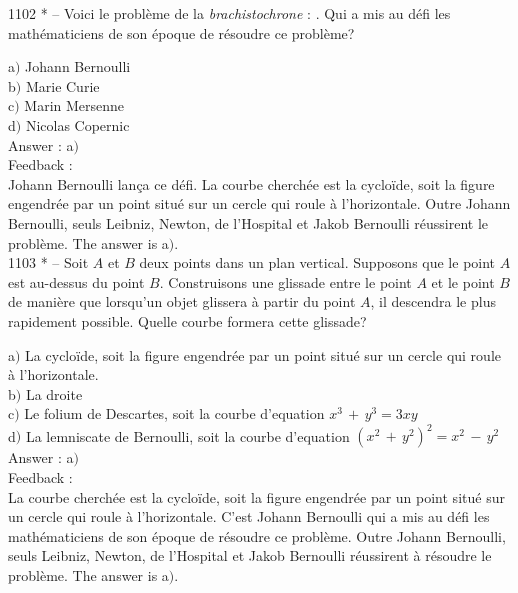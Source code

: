 \documentclass[letterpaper, 12pt]{article}
\begin{document}
1102 * -- Voici le probl\`eme de la {\it brachistochrone} : \fg. Qui a mis au
d\'efi les math\'ematiciens de son \'epoque de r\'esoudre ce
probl\`eme?

a$)$ Johann Bernoulli \\
b$)$ Marie Curie  \\
c$)$ Marin Mersenne  \\
d$)$ Nicolas Copernic \\

Answer : a$)$\\

Feedback : \\
Johann Bernoulli lan\c ca ce d\'efi. La courbe cherch\'ee est la
cyclo\"ide, soit la figure engendr\'ee par un point situ\'e sur un
cercle qui roule \`a l'horizontale. Outre Johann Bernoulli, seuls
Leibniz, Newton, de l'Hospital et Jakob Bernoulli r\'eussirent le
probl\`eme.
The answer is a$)$.\\

1103 * -- Soit $A$ et $B$ deux points dans un plan vertical.
Supposons que le point $A$ est au-dessus du point $B$. Construisons
une glissade entre le point $A$ et le point $B$ de mani\`ere que
lorsqu'un objet glissera \`a partir du point $A$, il descendra le
plus rapidement possible. Quelle courbe formera cette glissade?

a$)$ La cyclo\"ide, soit la figure engendr\'ee par un point situ\'e
sur un
cercle qui roule \`a l'horizontale. \\
b$)$ La droite  \\
c$)$ Le folium de Descartes, soit la courbe d'equation $x^3\,+\,y^3=3xy$
\\
d$)$ La lemniscate de Bernoulli, soit la courbe d'equation
$(x^2\,+\,y^2)^2=x^2\,-\,y^2$\\

Answer : a$)$\\

Feedback : \\
La courbe cherch\'ee est la cyclo\"ide, soit la figure engendr\'ee
par un point situ\'e sur un cercle qui roule \`a l'horizontale.
C'est Johann Bernoulli qui a mis au d\'efi les math\'ematiciens de
son \'epoque de r\'esoudre ce probl\`eme. Outre Johann Bernoulli,
seuls Leibniz, Newton, de l'Hospital et Jakob Bernoulli r\'eussirent
\`a r\'esoudre le probl\`eme.
The answer is a$)$.\\
\end{document}
